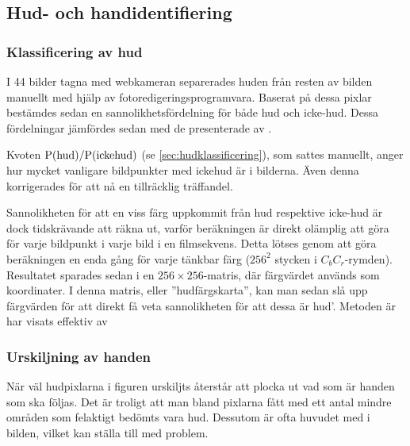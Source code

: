 \subsection{Hud- och handidentifiering}

\subsubsection{Klassificering av hud}
I 44 bilder tagna med webkameran separerades huden från resten av
bilden manuellt med hjälp av fotoredigeringsprogramvara. Baserat på
dessa pixlar bestämdes sedan en sannolikhetsfördelning för både hud
och icke-hud. Dessa fördelningar jämfördes sedan med de presenterade
av .

Kvoten $\mathrm{P}(\textrm{hud})/\mathrm{P}(\textrm{ickehud})$ (se
\ref{sec:hudklassificering}), som sattes
manuellt, anger hur mycket vanligare bildpunkter med ickehud är i
bilderna. Även denna korrigerades för att nå en tillräcklig träffandel.

Sannolikheten för att en viss färg uppkommit från hud respektive
icke-hud är dock tidskrävande att räkna ut, varför beräkningen
är direkt olämplig att göra för varje bildpunkt i varje bild i en
filmsekvens. Detta lötses genom att göra beräkningen en enda gång för
varje tänkbar färg ($256^2$ stycken i $C_bC_r$-rymden). Resultatet sparades
sedan i en $256\times256$-matris, där färgvärdet används som koordinater.
I denna matris, eller ''hudfärgskarta'', kan man sedan slå upp
färgvärden för att direkt få veta sannolikheten för att dessa är
hud'. Metoden är har visats effektiv av 

\subsubsection{Urskiljning av handen}\label{sec:metod_hud:urskiljning}

När väl hudpixlarna i figuren urskiljts återstår att plocka ut
vad som är handen som ska följas. Det är troligt att man bland
pixlarna fått med ett antal mindre områden som felaktigt bedömts vara
hud. Dessutom är ofta huvudet med i bilden, vilket kan ställa till med
problem. 

